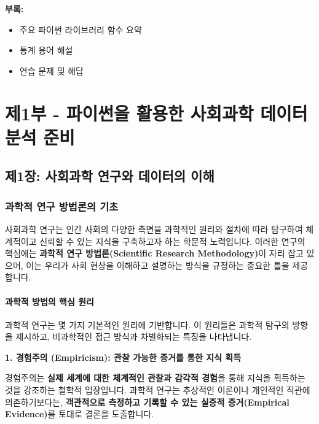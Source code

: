 \documentclass[
  letterpaper,
]{book}
\providecommand{\tightlist}{%
  \setlength{\itemsep}{0pt}\setlength{\parskip}{0pt}}
\begin{document}
\textbf{부록:}

\begin{itemize}
\tightlist
\item
  주요 파이썬 라이브러리 함수 요약
\item
  통계 용어 해설
\item
  연습 문제 및 해답
\end{itemize}

\part{제1부 - 파이썬을 활용한 사회과학 데이터 분석 준비}

\chapter{제1장: 사회과학 연구와 데이터의
이해}\label{uxc81c1uxc7a5-uxc0acuxd68cuxacfcuxd559-uxc5f0uxad6cuxc640-uxb370uxc774uxd130uxc758-uxc774uxd574}

\section{과학적 연구 방법론의
기초}\label{uxacfcuxd559uxc801-uxc5f0uxad6c-uxbc29uxbc95uxb860uxc758-uxae30uxcd08}

사회과학 연구는 인간 사회의 다양한 측면을 과학적인 원리와 절차에 따라
탐구하여 체계적이고 신뢰할 수 있는 지식을 구축하고자 하는 학문적
노력입니다. 이러한 연구의 핵심에는 \textbf{과학적 연구 방법론(Scientific
Research Methodology)}이 자리 잡고 있으며, 이는 우리가 사회 현상을
이해하고 설명하는 방식을 규정하는 중요한 틀을 제공합니다.

\subsection{과학적 방법의 핵심
원리}\label{uxacfcuxd559uxc801-uxbc29uxbc95uxc758-uxd575uxc2ec-uxc6d0uxb9ac}

과학적 연구는 몇 가지 기본적인 원리에 기반합니다. 이 원리들은 과학적
탐구의 방향을 제시하고, 비과학적인 접근 방식과 차별화되는 특징을
나타냅니다.

\textbf{1. 경험주의 (Empiricism): 관찰 가능한 증거를 통한 지식 획득}

경험주의는 \textbf{실제 세계에 대한 체계적인 관찰과 감각적 경험}을 통해
지식을 획득하는 것을 강조하는 철학적 입장입니다. 과학적 연구는 추상적인
이론이나 개인적인 직관에 의존하기보다는, \textbf{객관적으로 측정하고
기록할 수 있는 실증적 증거(Empirical Evidence)}를 토대로 결론을
도출합니다.
\end{document}
